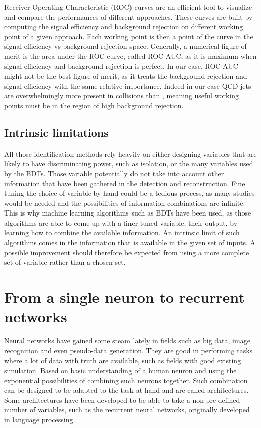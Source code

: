 Receiver Operating Characteristic (ROC) curves are an efficient tool to visualize and compare the performances of different approaches. These curves are built by computing the signal efficiency and background rejection on different working point of a given approach. Each working point is then a point of the curve in the signal efficiency vs background rejection space.
Generally, a numerical figure of merit is the area under the ROC curve, called ROC AUC, as it is maximum when signal efficiency and background rejection is perfect.
In our case, ROC AUC might not be the best figure of merit, as it treats the background rejection and signal efficiency with the same relative importance.
Indeed in our case QCD jets are overwhelmingly more present in collisions than \tauh, meaning useful working points must be in the region of high background rejection.

\subsection{Intrinsic limitations}

All those identification methods rely heavily on either designing variables that are likely to have discriminating power, such as isolation, or the many variables used by the BDTs. Those variable potentially do not take into account other information that have been gathered in the detection and reconstruction.
Fine tuning the choice of variable by hand could be a tedious process, as many studies would be needed and the possibilities of information combinations are infinite. This is why machine learning algorithms such as BDTs have been used, as those algorithms are able to come up with a finer tuned variable, their output, by learning how to combine the available information.
An intrinsic limit of such algorithms comes in the information that is available in the given set of inputs. 
A possible improvement should therefore be expected from using a more complete set of variable rather than a chosen set.


\section{From a single neuron to recurrent networks}
\label{sec:NN}
Neural networks have gained some steam lately in fields such as big data, image recognition and even pseudo-data generation.
They are good in performing tasks where a lot of data with truth are available, such as fields with good existing simulation.
Based on basic understanding of a human neuron and using the exponential possibilities of combining such neurons together.
Such combination can be designed to be adapted to the task at hand and are called architectures.
Some architectures have been developed to be able to take a non pre-defined number of variables, such as the recurrent neural networks, originally developed in language processing.

